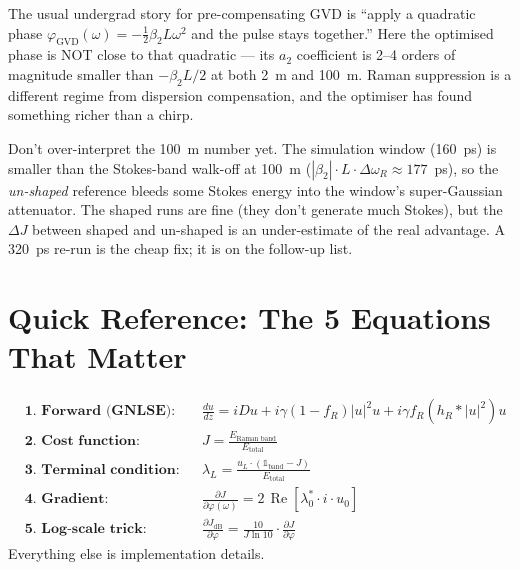 \documentclass[12pt,a4paper]{article}
\newcommand{\Real}{\operatorname{Re}}
\newcommand{\pdv}[2]{\frac{\partial #1}{\partial #2}}
\newcommand{\dv}[2]{\frac{d #1}{d #2}}
\begin{document}
\begin{intuition}
The usual undergrad story for pre-compensating GVD is ``apply a quadratic
phase $\varphi_\text{GVD}(\omega) = -\tfrac{1}{2}\beta_2 L \omega^2$ and
the pulse stays together.'' Here the optimised phase is NOT close to that
quadratic --- its $a_2$ coefficient is 2--4 orders of magnitude smaller
than $-\beta_2 L/2$ at both 2~m and 100~m. Raman suppression is a
different regime from dispersion compensation, and the optimiser has
found something richer than a chirp.
\end{intuition}

\begin{warning}
Don't over-interpret the 100~m number yet. The simulation window (160~ps)
is smaller than the Stokes-band walk-off at 100~m
($|\beta_2|\cdot L \cdot \Delta\omega_R \approx 177$~ps), so the
\emph{un-shaped} reference bleeds some Stokes energy into the window's
super-Gaussian attenuator. The shaped runs are fine (they don't generate
much Stokes), but the $\Delta J$ between shaped and un-shaped is an
under-estimate of the real advantage. A 320~ps re-run is the cheap fix;
it is on the follow-up list.
\end{warning}


\section*{Quick Reference: The 5 Equations That Matter}

\begin{tcolorbox}[colback=gray!5,colframe=gray!50!black]
\begin{align}
&\textbf{1. Forward (GNLSE):} && \dv{u}{z} = iDu + i\gamma(1-f_R)|u|^2u + i\gamma f_R(h_R*|u|^2)u \\[8pt]
&\textbf{2. Cost function:} && J = \frac{E_{\text{Raman band}}}{E_{\text{total}}} \\[8pt]
&\textbf{3. Terminal condition:} && \lambda_L = \frac{u_L\cdot(\mathbb{1}_{\text{band}} - J)}{E_{\text{total}}} \\[8pt]
&\textbf{4. Gradient:} && \pdv{J}{\varphi(\omega)} = 2\,\Real[\lambda_0^*\cdot i\cdot u_0] \\[8pt]
&\textbf{5. Log-scale trick:} && \pdv{J_{\text{dB}}}{\varphi} = \frac{10}{J\ln 10}\cdot\pdv{J}{\varphi}
\end{align}
Everything else is implementation details.
\end{tcolorbox}
\end{document}
